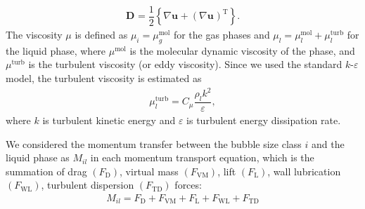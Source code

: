 \documentclass[3p, twocolumn, 10pt]{elsarticle}
\begin{document}
\begin{align}
  \bm{D}_{} =
  \dfrac{1}{2}
  \left\{
  \nabla\bm{u}_{}+
  \left(
  \nabla\bm{u}_{}
  \right)^\mathrm{T}
  \right\}.
\end{align}
The viscosity $\mu$ is defined as $\mu_{i} = \mu_{g}^{\mathrm{mol}}$ for the gas 
phases and $\mu_{l}=\mu_{l}^{\mathrm{mol}}+\mu_{l}^{\mathrm{turb}}$ for the liquid 
phase, where $\mu^{\mathrm{mol}}$ is the molecular dynamic viscosity of the phase, 
and $\mu^{\mathrm{turb}}$ is the turbulent viscosity (or eddy viscosity). Since we 
used the standard $k$-$\varepsilon$ model, the turbulent viscosity is estimated as
\begin{align}
  \mu_{l}^{\mathrm{turb}} = C_{\mu}\dfrac{\rho_{l}k^2}{\varepsilon},
\end{align}
where $k$ is turbulent kinetic energy and $\varepsilon$ is turbulent energy 
dissipation rate. 

We considered the momentum transfer between the bubble size class $i$ and the liquid phase as $M_{il}$ in each momentum transport equation, which is the summation of drag $\left(F_{\mathrm{D}}\right)$, virtual mass $\left(F_{\mathrm{VM}}\right)$, lift $\left(F_{\mathrm{L}}\right)$, wall lubrication $\left(F_{\mathrm{WL}}\right)$, turbulent dispersion $\left(F_{\mathrm{TD}}\right)$ forces:
\begin{align}
  M_{il} = F_{\mathrm{D}}+
  F_{\mathrm{VM}}+
  F_{\mathrm{L}}+
  F_{\mathrm{WL}}+
  F_{\mathrm{TD}}
\end{align}
\end{document}
